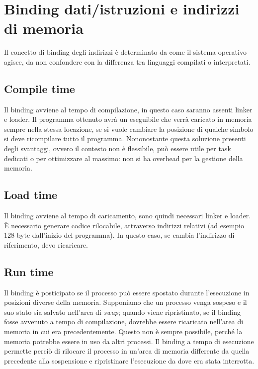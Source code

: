 \documentclass[a4paper,12pt, twoside]{report}
\begin{document}
\section{Binding dati/istruzioni e indirizzi di memoria}

Il concetto di binding degli indirizzi \`e determinato da come il sistema operativo agisce, da non confondere con la differenza tra linguaggi compilati o interpretati.

\subsection{Compile time}

Il binding avviene al tempo di compilazione, in questo caso saranno assenti linker e loader. 
Il programma ottenuto avr\`a  un eseguibile che verr\`a caricato in memoria sempre nella 
stessa locazione, se si vuole cambiare la posizione di qualche simbolo si deve ricompilare 
tutto il programma.  Nononostante questa soluzione presenti degli svantaggi, ovvero il 
contesto non \`e flessibile, pu\`o essere utile per task dedicati o per ottimizzare al 
massimo: non si ha overhead per la gestione della memoria.

\subsection{Load time}

Il binding avviene al tempo di caricamento, sono quindi necessari linker e loader. \`E necessario generare codice rilocabile, attraverso indirizzi relativi (ad esempio 128 byte dall'inizio del programma). In questo caso, se cambia l'indirizzo di riferimento, devo ricaricare.

\subsection{Run time}

Il binding \`e posticipato se il processo pu\`o essere spostato durante l'esecuzione in 
posizioni diverse della memoria. Supponiamo che un processo venga sospeso e il suo stato sia
salvato nell'area di \emph{swap}; quando viene ripristinato, se il binding fosse avvenuto a
tempo di compilazione, dovrebbe essere ricaricato nell'area di memoria in cui era 
precedentemente. Questo non \`e sempre possibile, perch\'e la memoria potrebbe essere in uso 
da altri processi. Il binding a tempo di esecuzione permette perci\`o di rilocare il processo
in un'area di memoria differente da quella precedente alla sospensione e ripristinare 
l'esecuzione da dove era stata interrotta. 
\end{document}
